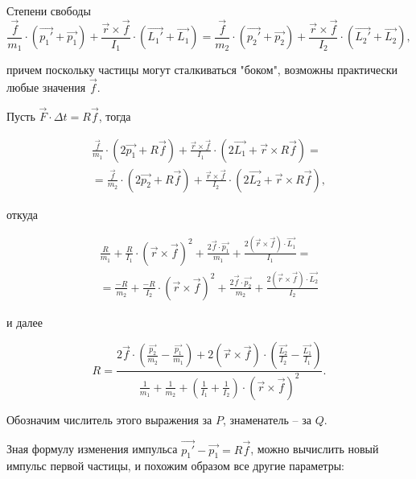 \documentclass{article}
\begin{document}
\begin{section}{Степени свободы}
		\begin{equation*}
			\frac{\vec{f}}{m_1} \cdot \left( \vec{p_1'} + \vec{p_1} \right) + \frac{\vec{r} \times \vec{f}}{I_1} \cdot \left( \vec{L_1'} + \vec{L_1} \right) = \frac{\vec{f}}{m_2} \cdot \left( \vec{p_2'} + \vec{p_2} \right) + \frac{\vec{r} \times \vec{f}}{I_2} \cdot \left( \vec{L_2'} + \vec{L_2} \right),
		\end{equation*}

		причем поскольку частицы могут сталкиваться "боком", возможны практически любые значения $\vec{f}$.

		Пусть $\vec{F} \cdot \Delta t = R \vec{f}$, тогда

		\begin{multline*}
			\frac{\vec{f}}{m_1} \cdot \left( 2 \vec{p_1} + R \vec{f} \right) + \frac{\vec{r} \times \vec{f}}{I_1} \cdot \left( 2 \vec{L_1} + \vec{r} \times R\vec{f} \right) = \\
			= \frac{\vec{f}}{m_2} \cdot \left( 2 \vec{p_2} + R \vec{f} \right) + \frac{\vec{r} \times \vec{f}}{I_2} \cdot \left( 2 \vec{L_2} + \vec{r} \times R\vec{f} \right),
		\end{multline*}

		откуда

		\begin{multline*}
			\frac{R}{m_1} + \frac{R}{I_1} \cdot \left( \vec{r} \times \vec{f} \right)^2 + \frac{2 \vec{f} \cdot \vec{p_1}}{m_1} + \frac{2 \left( \vec{r} \times \vec{f} \right) \cdot \vec{L_1}}{I_1} = \\
			= \frac{-R}{m_2} + \frac{-R}{I_2} \cdot \left( \vec{r} \times \vec{f} \right)^2 + \frac{2 \vec{f} \cdot \vec{p_2}}{m_2} + \frac{2 \left( \vec{r} \times \vec{f} \right) \cdot \vec{L_2}}{I_2}
		\end{multline*}

		и далее

		\begin{equation*}
			R = \frac{2 \vec{f} \cdot \left( \frac{\vec{p_2}}{m_2} - \frac{\vec{p_1}}{m_1} \right) + 2 \left( \vec{r} \times \vec{f} \right) \cdot \left( \frac{\vec{L_2}}{I_2} - \frac{\vec{L_1}}{I_1} \right)}{\frac{1}{m_1} + \frac{1}{m_2} + \left( \frac{1}{I_1} + \frac{1}{I_2} \right) \cdot \left( \vec{r} \times \vec{f} \right)^2}.
		\end{equation*}

		Обозначим числитель этого выражения за $P$, знаменатель -- за $Q$.

		Зная формулу изменения импульса $\vec{p_1'} - \vec{p_1} = R \vec{f}$, можно вычислить новый импульс первой частицы, и похожим образом все другие параметры:


\end{section}
\end{document}
